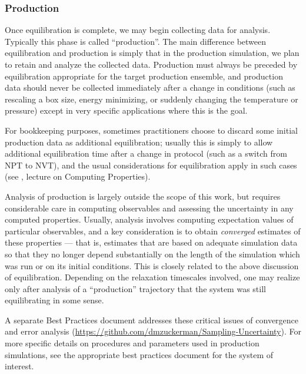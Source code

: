 \documentclass[9pt,bestpractices]{livecoms}
\begin{document}
\subsubsection{Production}

Once equilibration is complete, we may begin collecting data for analysis.
Typically this phase is called ``production''.
The main difference between equilibration and production is simply that in the production simulation, we plan to retain and analyze the collected data.
Production must always be preceded by equilibration appropriate for the target production ensemble, and production data should never be collected immediately after a change in conditions (such as rescaling a box size, energy minimizing, or suddenly changing the temperature or pressure) except in very specific applications where this is the goal.

For bookkeeping purposes, sometimes practitioners choose to discard some initial production data as additional equilibration; usually this is simply to allow additional equilibration time after a change in protocol (such as a switch from NPT to NVT), and the usual considerations for equilibration apply in such cases (see \citet{ShellNotes}, lecture on Computing Properties).

Analysis of production is largely outside the scope of this work, but requires considerable care in computing observables and assessing the uncertainty in any computed properties.
Usually, analysis involves computing expectation values of particular observables, and a key consideration is to obtain \emph{converged} estimates of these properties --- that is, estimates that are based on adequate simulation data so that they no longer depend substantially on the length of the simulation which was run or on its initial conditions.
This is closely related to the above discussion of equilibration.
Depending on the relaxation timescales involved, one may realize only after analysis of a ``production'' trajectory that the system was still equilibrating in some sense.

A separate Best Practices document addresses these critical issues of convergence and error analysis (\url{https://github.com/dmzuckerman/Sampling-Uncertainty}).
For more specific details on procedures and parameters used in production simulations, see the appropriate best practices document for the system of interest.
\end{document}
